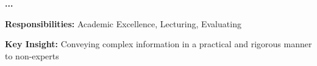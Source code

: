 \documentclass[10pt,a4paper]{altacv}
\begin{document}
 \textbf{...}

\textbf{Responsibilities:} Academic Excellence, Lecturing, Evaluating 

\textbf{Key Insight:} Conveying complex information in a practical and rigorous manner to non-experts










\clearpage









\clearpage
\end{document}
